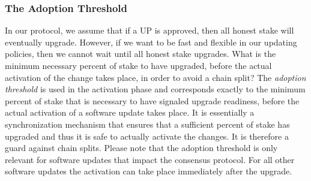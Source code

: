 

\subsubsection{The Adoption Threshold}
In our protocol, we assume that if a UP is approved, then all honest stake will eventually upgrade. However, if we want to be fast and flexible in our updating policies, then we cannot wait until all honest stake upgrades. What is the minimum necessary percent of stake to have upgraded, before the actual activation of the change takes place, in order to avoid a chain split? The \emph{adoption threshold} is used in the activation phase and corresponds exactly to the minimum percent of stake that is necessary to have signaled upgrade readiness, before the actual activation of a software update takes place. It is essentially a synchronization mechanism that ensures that a sufficient percent of stake has upgraded and thus it is safe to actually activate the changes. It is therefore a guard against chain splits. Please note that the adoption threshold is only relevant for software updates that impact the consensus protocol. For all other software updates the activation can take place immediately after the upgrade.

